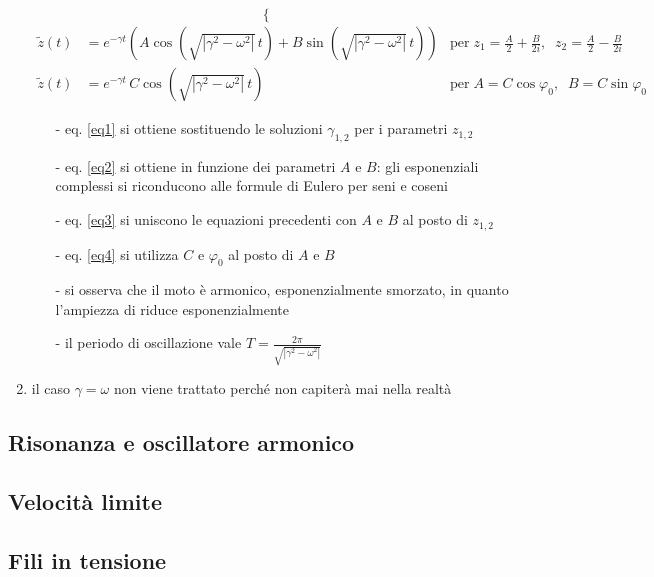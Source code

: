 \documentclass[a4paper]{article}
\begin{document}
\begin{enumerate}
\begin{equation}
\begin{cases}
		\end{cases}
	\end{equation}
	\begin{align}
		\label{eq3}	\tilde{z}(t) &= e^{-\gamma t} \left( A \cos \left(\sqrt{\left|\gamma^2 - \omega^2\right|} \, t\right) + B \sin \left( \sqrt{\left|\gamma^2 - \omega^2\right|} \, t \right) \right) &\text{per} \; z_1 = \frac{A}{2} + \frac{B}{2i}, \; \; z_2 = \frac{A}{2} - \frac{B}{2i} \\
		\label{eq4}	\tilde{z}(t) &= e^{-\gamma t} \, C \cos \left(\sqrt{\left|\gamma^2 - \omega^2\right|} \, t\right) &\text{per} \; A = C \cos \varphi_0, \; \; B = C \sin \varphi_0
	\end{align}
	\begin{itemize}[topsep=3pt, itemsep=0pt]
		\item[-] eq. \eqref{eq1} si ottiene sostituendo le soluzioni \(\gamma_{1,2}\) per i parametri \(z_{1,2}\)
		\item[-] eq. \eqref{eq2} si ottiene in funzione dei parametri \(A\) e \(B\): gli esponenziali complessi si riconducono alle formule di Eulero per seni e coseni
		\item[-] eq. \eqref{eq3} si uniscono le equazioni precedenti con \(A\) e \(B\) al posto di \(z_{1,2}\)
		\item[-] eq. \eqref{eq4} si utilizza \(C\) e \(\varphi_0\) al posto di \(A\) e \(B\)
		\item[-] si osserva che il moto è armonico, esponenzialmente smorzato, in quanto l'ampiezza di riduce esponenzialmente
		\item[-] il periodo di oscillazione vale \(\displaystyle T = \frac{2 \pi}{\sqrt{\left|\gamma^2 - \omega^2\right|}}\)
	\end{itemize}
	\item il caso \(\gamma = \omega\) non viene trattato perché non capiterà mai nella realtà
\end{enumerate}

\newpage


\subsection{Risonanza e oscillatore armonico}

\newpage

\subsection{Velocità limite}
\subsection{Fili in tensione}
\end{document}

